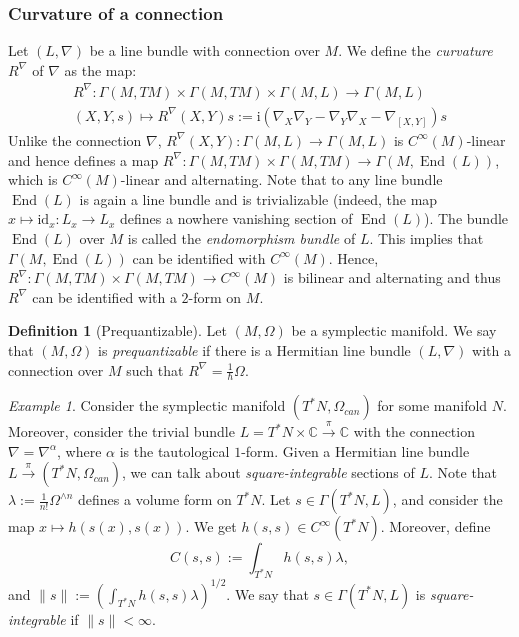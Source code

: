 \documentclass[12pt]{amsart}
\numberwithin{equation}{section}
\theoremstyle{plain}
\theoremstyle{definition}
\newtheorem{defn}{Definition}[subsection]
\theoremstyle{remark}
\newtheorem{ex}{Example}[subsection]
\newcommand{\id}{\mathrm{id}}
\DeclareMathOperator{\End}{End}
\newcommand{\I}{\mathrm{i}}
\begin{document}
\subsubsection{Curvature of a connection}
Let $(L,\nabla)$ be a line bundle with connection over $M$. We define the \emph{curvature} $R^\nabla$ of $\nabla$ as the map:
\begin{multline*} 
R^\nabla\colon \Gamma(M,TM)\times\Gamma(M,TM)\times \Gamma(M,L)\to \Gamma(M,L)\\
(X,Y,s)\mapsto R^\nabla(X,Y)s:=\I\left(\nabla_X\nabla_Y-\nabla_Y\nabla_X-\nabla_{[X,Y]}\right)s
\end{multline*}
Unlike the connection $\nabla$, $R^\nabla(X,Y)\colon \Gamma(M,L)\to \Gamma(M,L)$ is $C^\infty(M)$-linear and hence defines a map $R^\nabla\colon \Gamma(M,TM)\times\Gamma(M,TM)\to \Gamma(M,\End(L))$, which is $C^\infty(M)$-linear and alternating. Note that to any line bundle $\End(L)$ is again a line bundle and is trivializable (indeed, the map $x\mapsto \id_x\colon L_x\to L_x$ defines a nowhere vanishing section of $\End(L)$). The bundle $\End(L)$ over $M$ is called the \emph{endomorphism bundle} of $L$. This implies that $\Gamma(M,\End(L))$ can be identified with $C^\infty(M)$. Hence, $R^\nabla\colon \Gamma(M,TM)\times \Gamma(M,TM)\to C^\infty(M)$ is bilinear and alternating and thus $R^\nabla$ can be identified with a $2$-form on $M$.

\begin{defn}[Prequantizable]
Let $(M,\Omega)$ be a symplectic manifold. We say that $(M,\Omega)$ is \emph{prequantizable} if there is a Hermitian line bundle $(L,\nabla)$ with a connection over $M$ such that $R^\nabla=\frac{1}{\hbar}\Omega$.
\end{defn}

\begin{ex}
Consider the symplectic manifold $(T^*N,\Omega_{can})$ for some manifold $N$. Moreover, consider the trivial bundle $L=T^*N\times\mathbb{C}\xrightarrow{\pi}\mathbb{C}$ with the connection $\nabla=\nabla^\alpha$, where $\alpha$ is the tautological $1$-form. Given a Hermitian line bundle $L\xrightarrow{\pi}(T^*N,\Omega_{can})$, we can talk about \emph{square-integrable} sections of $L$. Note that $\lambda:=\frac{1}{n!}\Omega^{\land n}$ defines a volume form on $T^*N$. Let $s\in \Gamma(T^*N,L)$, and consider the map $x\mapsto h(s(x),s(x))$. We get $h(s,s)\in C^\infty(T^*N)$. Moreover, define 
\begin{equation}
\label{inner_prod}
C(s,s):=\int_{T^*N}h(s,s)\lambda,
\end{equation}
and $\|s\|:=\left(\int_{T^*N}h(s,s)\lambda\right)^{1/2}$. We say that $s\in\Gamma(T^*N,L)$ is \emph{square-integrable} if $\|s\|<\infty$. 
\end{ex}
\end{document}
